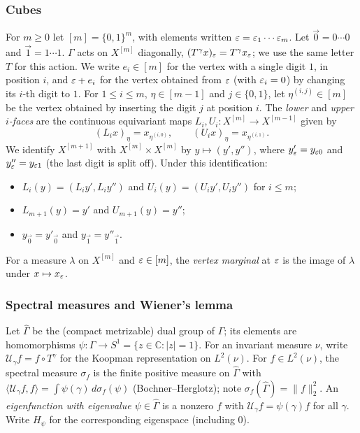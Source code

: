 \subsubsection*{Cubes}
For $m\ge0$ let $[m]=\{0,1\}^m$, with elements written $\varepsilon=\varepsilon_1\cdots\varepsilon_m$.
Let $\vec0=0\cdots0$ and $\vec1=1\cdots1$.
$\Gamma$ acts on $X^{[m]}$ diagonally, $(T^\gamma x)_\varepsilon=T^\gamma x_\varepsilon$; we use the same
letter $T$ for this action.
We write $e_i\in[m]$ for the vertex with a single digit $1$, in position $i$, and
$\varepsilon+e_i$ for the vertex obtained from $\varepsilon$ (with $\varepsilon_i=0$) by changing its $i$-th
digit to $1$.
For $1\le i\le m$, $\eta\in[m-1]$ and $j\in\{0,1\}$, let $\eta^{(i,j)}\in[m]$ be the vertex
obtained by inserting the digit $j$ at position $i$.
The \emph{lower} and \emph{upper $i$-faces} are the continuous equivariant maps
$L_i,U_i\colon X^{[m]}\to X^{[m-1]}$ given by
\[
(L_ix)_\eta=x_{\eta^{(i,0)}},\qquad (U_ix)_\eta=x_{\eta^{(i,1)}} .
\]
We identify $X^{[m+1]}$ with $X^{[m]}\times X^{[m]}$ by $y\mapsto(y',y'')$, where
$y'_\varepsilon=y_{\varepsilon0}$ and $y''_\varepsilon=y_{\varepsilon1}$ (the last digit is split off).
Under this identification:
\begin{itemize}
\item $L_i(y)=(L_iy',L_iy'')$ and $U_i(y)=(U_iy',U_iy'')$ for $i\le m$;
\item $L_{m+1}(y)=y'$ and $U_{m+1}(y)=y''$;
\item $y_{\vec0}=y'_{\vec0}$ and $y_{\vec1}=y''_{\vec1}$.
\end{itemize}
For a measure $\lambda$ on $X^{[m]}$ and $\varepsilon\in[m]$, the \emph{vertex marginal} at $\varepsilon$ is
the image of $\lambda$ under $x\mapsto x_\varepsilon$.

\subsubsection*{Spectral measures and Wiener's lemma}
Let $\widehat\Gamma$ be the (compact metrizable) dual group of $\Gamma$; its elements are
homomorphisms $\psi\colon\Gamma\to S^1=\{z\in\mathbb C:|z|=1\}$.
For an invariant measure $\nu$, write $\mathcal U_\gamma f=f\circ T^\gamma$ for the Koopman
representation on $L^2(\nu)$.
For $f\in L^2(\nu)$, the spectral measure $\sigma_f$ is the finite positive measure on
$\widehat\Gamma$ with $\langle\mathcal U_\gamma f,f\rangle=\int\psi(\gamma)\,d\sigma_f(\psi)$
(Bochner--Herglotz); note $\sigma_f(\widehat\Gamma)=\|f\|_2^2$.
An \emph{eigenfunction with eigenvalue $\psi\in\widehat\Gamma$} is a nonzero $f$ with
$\mathcal U_\gamma f=\psi(\gamma)f$ for all $\gamma$. Write $H_\psi$ for the corresponding
eigenspace (including $0$).

